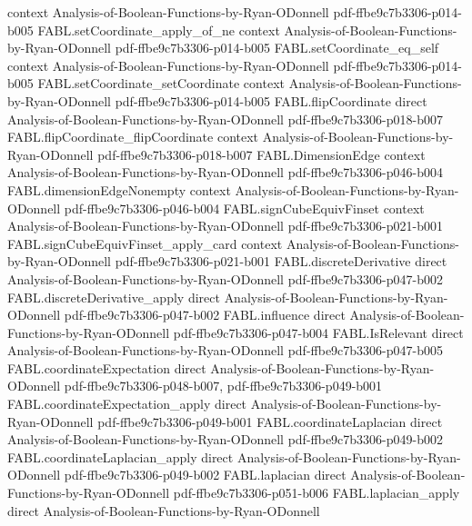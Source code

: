 \begin{theorem}
  {context}
  {Analysis-of-Boolean-Functions-by-Ryan-ODonnell}
  {pdf-ffbe9c7b3306-p014-b005}
\proofstep
  {FABL.setCoordinate_apply_of_ne}
  {context}
  {Analysis-of-Boolean-Functions-by-Ryan-ODonnell}
  {pdf-ffbe9c7b3306-p014-b005}
\proofstep
  {FABL.setCoordinate_eq_self}
  {context}
  {Analysis-of-Boolean-Functions-by-Ryan-ODonnell}
  {pdf-ffbe9c7b3306-p014-b005}
\proofstep
  {FABL.setCoordinate_setCoordinate}
  {context}
  {Analysis-of-Boolean-Functions-by-Ryan-ODonnell}
  {pdf-ffbe9c7b3306-p014-b005}
\proofstep
  {FABL.flipCoordinate}
  {direct}
  {Analysis-of-Boolean-Functions-by-Ryan-ODonnell}
  {pdf-ffbe9c7b3306-p018-b007}
\proofstep
  {FABL.flipCoordinate_flipCoordinate}
  {context}
  {Analysis-of-Boolean-Functions-by-Ryan-ODonnell}
  {pdf-ffbe9c7b3306-p018-b007}
\proofstep
  {FABL.DimensionEdge}
  {context}
  {Analysis-of-Boolean-Functions-by-Ryan-ODonnell}
  {pdf-ffbe9c7b3306-p046-b004}
\proofstep
  {FABL.dimensionEdgeNonempty}
  {context}
  {Analysis-of-Boolean-Functions-by-Ryan-ODonnell}
  {pdf-ffbe9c7b3306-p046-b004}
\proofstep
  {FABL.signCubeEquivFinset}
  {context}
  {Analysis-of-Boolean-Functions-by-Ryan-ODonnell}
  {pdf-ffbe9c7b3306-p021-b001}
\proofstep
  {FABL.signCubeEquivFinset_apply_card}
  {context}
  {Analysis-of-Boolean-Functions-by-Ryan-ODonnell}
  {pdf-ffbe9c7b3306-p021-b001}
\proofstep
  {FABL.discreteDerivative}
  {direct}
  {Analysis-of-Boolean-Functions-by-Ryan-ODonnell}
  {pdf-ffbe9c7b3306-p047-b002}
\proofstep
  {FABL.discreteDerivative_apply}
  {direct}
  {Analysis-of-Boolean-Functions-by-Ryan-ODonnell}
  {pdf-ffbe9c7b3306-p047-b002}
\proofstep
  {FABL.influence}
  {direct}
  {Analysis-of-Boolean-Functions-by-Ryan-ODonnell}
  {pdf-ffbe9c7b3306-p047-b004}
\proofstep
  {FABL.IsRelevant}
  {direct}
  {Analysis-of-Boolean-Functions-by-Ryan-ODonnell}
  {pdf-ffbe9c7b3306-p047-b005}
\proofstep
  {FABL.coordinateExpectation}
  {direct}
  {Analysis-of-Boolean-Functions-by-Ryan-ODonnell}
  {pdf-ffbe9c7b3306-p048-b007,
    pdf-ffbe9c7b3306-p049-b001}
\proofstep
  {FABL.coordinateExpectation_apply}
  {direct}
  {Analysis-of-Boolean-Functions-by-Ryan-ODonnell}
  {pdf-ffbe9c7b3306-p049-b001}
\proofstep
  {FABL.coordinateLaplacian}
  {direct}
  {Analysis-of-Boolean-Functions-by-Ryan-ODonnell}
  {pdf-ffbe9c7b3306-p049-b002}
\proofstep
  {FABL.coordinateLaplacian_apply}
  {direct}
  {Analysis-of-Boolean-Functions-by-Ryan-ODonnell}
  {pdf-ffbe9c7b3306-p049-b002}
\proofstep
  {FABL.laplacian}
  {direct}
  {Analysis-of-Boolean-Functions-by-Ryan-ODonnell}
  {pdf-ffbe9c7b3306-p051-b006}
\proofstep
  {FABL.laplacian_apply}
  {direct}
  {Analysis-of-Boolean-Functions-by-Ryan-ODonnell}

\end{theorem}
